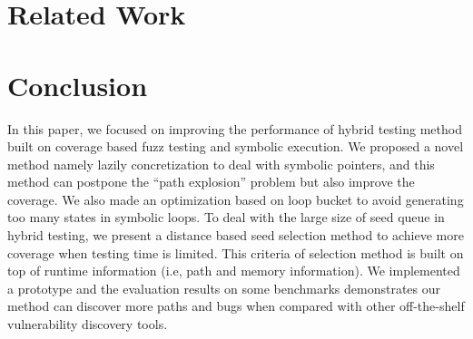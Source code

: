 \documentclass[a4paper]{article}
\begin{document}

\section{Related Work} \label{sec:related}


\section{Conclusion} \label{sec:conclusion}
In this paper, we focused on improving the performance of hybrid testing method built on coverage based fuzz testing and symbolic execution. We proposed a novel method namely lazily concretization to deal with symbolic pointers, and this method can postpone the ``path explosion'' problem but also improve the coverage. We also made an optimization based on loop bucket to avoid generating too many states in symbolic loops. To deal with the large size of seed queue in hybrid testing, we present a distance based seed selection method to achieve more coverage when testing time is limited. This criteria of selection method is built on top of runtime information (i.e, path and memory information). We implemented a prototype and the evaluation results on some benchmarks demonstrates our method can discover more paths and bugs when compared with other off-the-shelf vulnerability discovery tools.



\end{document}
